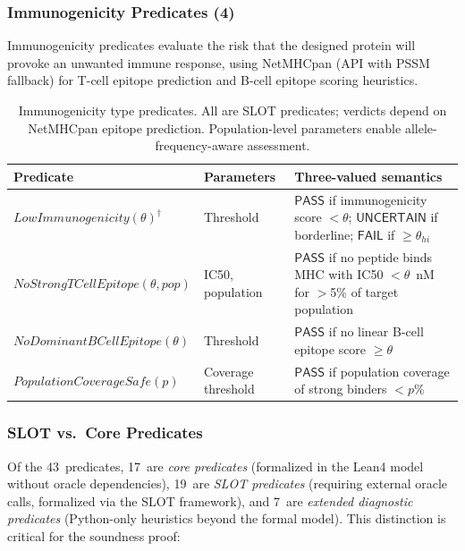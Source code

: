\documentclass[acmsmall,review,anonymous]{acmart}
\newcommand{\PASS}{\ensuremath{\mathsf{PASS}}\xspace}
\newcommand{\FAIL}{\ensuremath{\mathsf{FAIL}}\xspace}
\newcommand{\UNCERTAIN}{\ensuremath{\mathsf{UNCERTAIN}}\xspace}
\begin{document}
\subsubsection{Immunogenicity Predicates (4)}

Immunogenicity predicates evaluate the risk that the designed protein
will provoke an unwanted immune response, using NetMHCpan (API with
PSSM fallback) for T-cell epitope prediction and B-cell epitope
scoring heuristics.

\begin{table}[t]
\centering
\caption{Immunogenicity type predicates. All are SLOT predicates;
         verdicts depend on NetMHCpan epitope prediction.
         Population-level parameters enable allele-frequency-aware
         assessment.}
\label{tab:imm-predicates}
\begin{tabular}{llp{4.6cm}}
\toprule
\textbf{Predicate} & \textbf{Parameters} & \textbf{Three-valued semantics} \\
\midrule
$\mathit{LowImmunogenicity}(\theta)^\dagger$ & Threshold &
  \PASS{} if immunogenicity score $< \theta$; \UNCERTAIN{} if
  borderline; \FAIL{} if $\ge \theta_{\mathit{hi}}$ \\
$\mathit{NoStrongTCellEpitope}(\theta,\mathit{pop})$ & IC50, population &
  \PASS{} if no peptide binds MHC with IC50 $< \theta$~nM for
  $>$5\% of target population \\
$\mathit{NoDominantBCellEpitope}(\theta)$ & Threshold &
  \PASS{} if no linear B-cell epitope score $\ge \theta$ \\
$\mathit{PopulationCoverageSafe}(p)$ & Coverage threshold &
  \PASS{} if population coverage of strong binders $< p$\% \\
\bottomrule
\end{tabular}
\end{table}

\subsubsection{SLOT vs.\ Core Predicates}

Of the 43~predicates, 17~are \emph{core predicates} (formalized in
the Lean4 model without oracle dependencies), 19~are \emph{SLOT
predicates} (requiring external oracle calls, formalized via the SLOT
framework), and 7~are \emph{extended diagnostic predicates} (Python-only
heuristics beyond the formal model).
This distinction is critical for the soundness proof:
\end{document}
